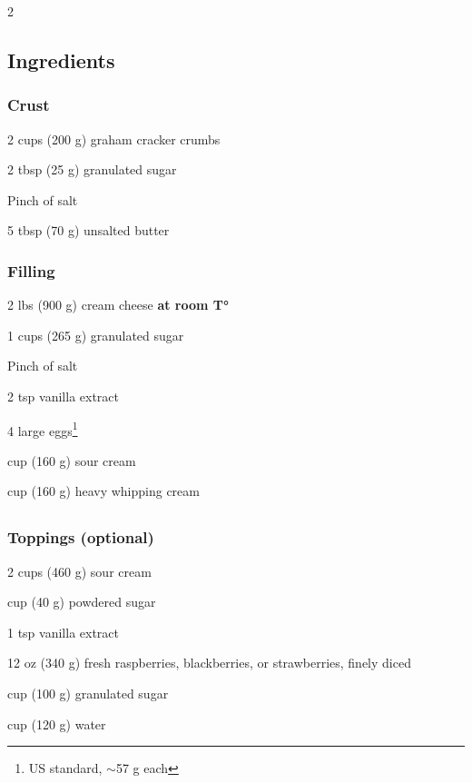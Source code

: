 \newpage
{}

\begin{multicols}{2}
	\subsection*{Ingredients}
	
	\subsubsection*{Crust}
	\begin{ingredients}
		\item 2 cups (200 g) graham cracker crumbs
		\item 2 tbsp (25 g) granulated sugar
		\item Pinch of salt
		\item 5 tbsp (70 g) unsalted butter
	\end{ingredients}
	
	\subsubsection*{Filling}
	\begin{ingredients}
		\item 2 lbs (900 g) cream cheese \textbf{at room T°}
		\item 1 cups (265 g) granulated sugar
		\item Pinch of salt
		\item 2 tsp vanilla extract
		\item 4 large eggs\footnote{US standard, $\sim$57 g each}
		\item {} cup (160 g) sour cream
		\item {} cup (160 g) heavy whipping cream
	\end{ingredients}
	\columnbreak
	\subsection*{ }
	\subsubsection*{Toppings \normalfont(optional)}
	\begin{ingredients}
		\item 2 cups (460 g) sour cream
		\item {} cup (40 g) powdered sugar
		\item 1 tsp vanilla extract
		\item 12 oz (340 g) fresh raspberries, blackberries, or strawberries, finely diced
		\item {} cup (100 g) granulated sugar
		\item {} cup (120 g) water
	\end{ingredients}
	

\end{multicols}
